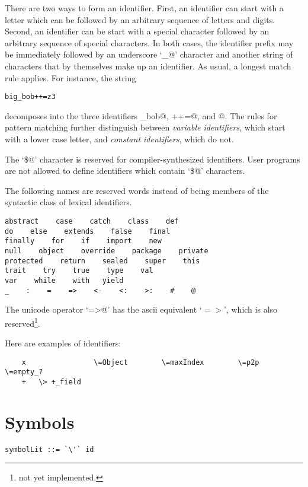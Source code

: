 \documentclass[11pt]{report}
\newcommand{\notyet}{\footnote{not yet implemented.}}
\begin{document}
There are two ways to form an identifier. First, an identifier can
start with a letter which can be followed by an arbitrary sequence of
letters and digits. Second, an identifier can be start with a special
character followed by an arbitrary sequence of special characters.
In both cases, the identifier prefix may be immediately followed
by an underscore `\verb@_@' character and another string of characters
that by themselves make up an identifier.  As usual, a longest match
rule applies. For instance, the string

\begin{verbatim}
big_bob++=z3
\end{verbatim}

decomposes into the three identifiers \verb@big_bob@, \verb@++=@, and
@.  The rules for pattern matching further distinguish between
{\em variable identifiers}, which start with a lower case letter, and
{\em constant identifiers}, which do not.


The `\verb@\$@' character is reserved for compiler-synthesized identifiers.
User programs are not allowed to define identifiers which contain `\verb@\$@'
characters.

The following names are reserved words instead of being members of the
syntactic class \verb@id@ of lexical identifiers.

\begin{verbatim}
abstract    case    catch    class    def    
do    else    extends    false    final    
finally    for    if    import    new    
null    object    override    package    private    
protected    return    sealed    super    this    
trait    try    true    type    val    
var    while    with   yield
_    :    =    =>    <-    <:    >:    #    @
\end{verbatim}

The unicode operator `\verb@=>@' has the ascii equivalent
`$=>$', which is also reserved\notyet.

\example
Here are examples of identifiers:
\begin{verbatim}
    x                \=Object        \=maxIndex        \=p2p             \=empty_?
    +   \> +_field
\end{verbatim}

\section{Symbols}

\syntax\begin{verbatim}
symbolLit ::= `\'` id
\end{verbatim}
\end{document}
